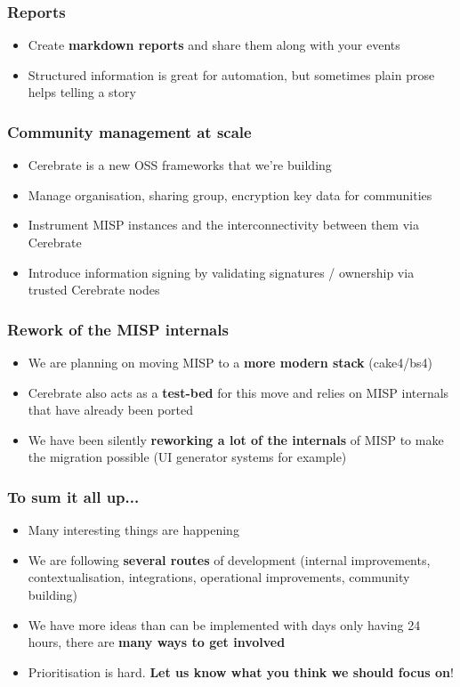 \begin{frame}
\frametitle{Reports}
\begin{itemize}
	\item Create {\bf markdown reports} and share them along with your events
        \item Structured information is great for automation, but sometimes plain prose helps telling a story
\end{itemize}
\end{frame}

\begin{frame}
\frametitle{Community management at scale}
\begin{itemize}
	\item Cerebrate is a new OSS frameworks that we're building
        \item Manage organisation, sharing group, encryption key data for communities
        \item Instrument MISP instances and the interconnectivity between them via Cerebrate
        \item Introduce information signing by validating signatures / ownership via trusted Cerebrate nodes
\end{itemize}
\end{frame}

\begin{frame}
\frametitle{Rework of the MISP internals}
\begin{itemize}
	\item We are planning on moving MISP to a {\bf more modern stack} (cake4/bs4)
        \item Cerebrate also acts as a {\bf test-bed} for this move and relies on MISP internals that have already been ported
        \item We have been silently {\bf reworking a lot of the internals} of MISP to make the migration possible (UI generator systems for example)
\end{itemize}
\end{frame}

\begin{frame}
  \frametitle{To sum it all up...}
  \begin{itemize}
     \item Many interesting things are happening
     \item We are following {\bf several routes} of development (internal improvements, contextualisation, integrations, operational improvements, community building)
     \item We have more ideas than can be implemented with days only having 24 hours, there are {\bf many ways to get involved}
     \item Prioritisation is hard. {\bf Let us know what you think we should focus on}!
  \end{itemize}
\end{frame}

